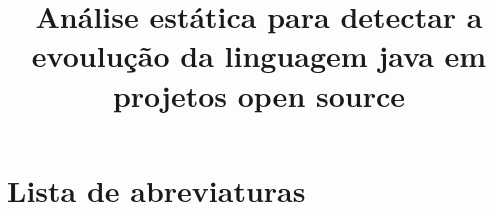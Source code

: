 \documentclass[licenciatura]{unb-cic}
\title{Análise estática para detectar a evoulução da linguagem java em projetos open source}
\begin{document}
  \maketitle
  \pretextual

  \begin{dedicatoria}
	  
  \end{dedicatoria}

  \begin{agradecimentos}
	
  \end{agradecimentos}

  \begin{resumo}
	
  \end{resumo}


  \begin{abstract}
  	
  \end{abstract}
  
  


  \tableofcontents
  \listoffigures
  \listoftables
  
  
  \chapter*{Lista de abreviaturas}
  
  
  

  \textual
 
  
  
  
  
  
  
  \postextual
  
  
	
\end{document}
